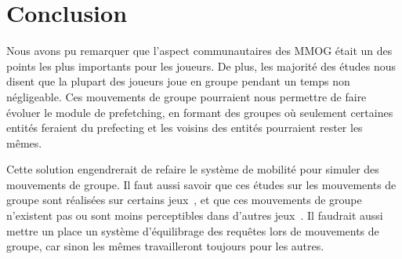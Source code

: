 \documentclass[10pt,twocolumn]{article}
\begin{document}
\section{Conclusion}
Nous avons pu remarquer que l'aspect communautaires des MMOG était un des points les plus importants pour les joueurs. De plus, les majorité des études nous disent que la plupart des joueurs joue en groupe pendant un temps non négligeable. Ces mouvements de groupe pourraient nous permettre de faire évoluer le module de prefetching, en formant des groupes où seulement certaines entités feraient du prefecting et les voisins des entités pourraient rester les mêmes.
\par Cette solution engendrerait de refaire le système de mobilité pour simuler des mouvements de groupe. Il faut aussi savoir que ces études sur les mouvements de groupe sont réalisées sur certains jeux~\cite{wow,everquest}, et que ces mouvements de groupe n'existent pas ou sont moins perceptibles dans d'autres jeux~\cite{sl}. Il faudrait aussi mettre un place un système d'équilibrage des requêtes lors de mouvements de groupe, car sinon les mêmes travailleront toujours pour les autres.





 
\end{document}
